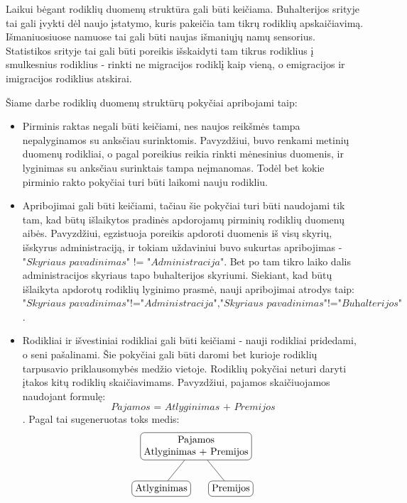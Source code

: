 \documentclass{VUMIFPSbakalaurinis}
\begin{document}
Laikui bėgant rodiklių duomenų struktūra gali būti keičiama. Buhalterijos srityje tai gali įvykti dėl naujo įstatymo, kuris pakeičia tam tikrų rodiklių apskaičiavimą. Išmaniuosiuose namuose tai gali būti naujas išmaniųjų namų sensorius. Statistikos srityje tai gali būti poreikis išskaidyti tam tikrus rodiklius į smulkesnius rodiklius - rinkti ne migracijos rodiklį kaip vieną, o emigracijos ir imigracijos rodiklius atskirai. \par
Šiame darbe rodiklių duomenų struktūrų pokyčiai apribojami taip:
\begin{itemize}
    \item Pirminis raktas negali būti keičiami, nes naujos reikšmės tampa nepalyginamos su anksčiau surinktomis. Pavyzdžiui, buvo renkami metinių duomenų rodikliai, o pagal poreikius reikia rinkti mėnesinius duomenis, ir lyginimas su anksčiau surinktais tampa neįmanomas. Todėl bet kokie pirminio rakto pokyčiai turi būti laikomi nauju rodikliu. 
    \item Apribojimai gali būti keičiami, tačiau šie pokyčiai turi būti naudojami tik tam, kad būtų išlaikytos pradinės apdorojamų pirminių rodiklių duomenų aibės. Pavyzdžiui, egzistuoja poreikis apdoroti duomenis iš visų skyrių, išskyrus administraciją, ir tokiam uždaviniui buvo sukurtas apribojimas - \(\textit{"Skyriaus pavadinimas" != "Administracija"}\). Bet po tam tikro laiko dalis administracijos skyriaus tapo buhalterijos skyriumi. Siekiant, kad būtų išlaikyta apdorotų rodiklių lyginimo prasmė, nauji apribojimai atrodys taip: \(\textit{"Skyriaus pavadinimas"!="Administracija"}, \textit{"Skyriaus pavadinimas"!="Buhalterijos"}\).
    \item Rodikliai ir išvestiniai rodikliai gali būti keičiami - nauji rodikliai pridedami, o seni pašalinami. Šie pokyčiai gali būti daromi bet kurioje rodiklių tarpusavio priklausomybės medžio vietoje. Rodiklių pokyčiai neturi daryti įtakos kitų rodiklių skaičiavimams. Pavyzdžiui, pajamos skaičiuojamos naudojant formulę: \[\textit{Pajamos = Atlyginimas + Premijos}\]. Pagal tai sugeneruotas toks medis: 
    \[	
        \begin{tikzpicture}[sibling distance=7em,	
            every node/.style = {shape=rectangle, rounded corners,	
                                 draw, align=center,	
                                 top color=white, bottom color=white}]	
            \node {Pajamos\\Atlyginimas + Premijos}	
                    child { node {Atlyginimas} }	
                    child { node {Premijos} } ;	
        \end{tikzpicture} 	
\]
\end{itemize}
\end{document}
